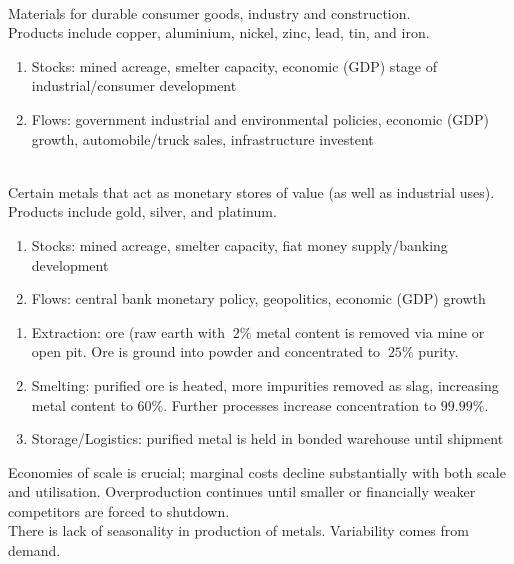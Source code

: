 \begin{remark}  \\
Materials for durable consumer goods, industry and construction.\\
Products include copper, aluminium, nickel, zinc, lead, tin, and iron.
\begin{enumerate}[label=\roman*.]
\setlength{\itemsep}{0pt}
\item Stocks: mined acreage, smelter capacity, economic (GDP) stage of industrial/consumer development
\item Flows: government industrial and environmental policies, economic (GDP) growth, automobile/truck sales, infrastructure investent
\end{enumerate}
\end{remark}

\begin{remark}  \\
Certain metals that act as monetary stores of value (as well as industrial uses).\\
Products include gold, silver, and platinum.
\begin{enumerate}[label=\roman*.]
\setlength{\itemsep}{0pt}
\item Stocks: mined acreage, smelter capacity, fiat money supply/banking development
\item Flows: central bank monetary policy, geopolitics, economic (GDP) growth
\end{enumerate}
\end{remark}

\begin{remark} 
\begin{enumerate}[label=\roman*.]
\setlength{\itemsep}{0pt}
\item Extraction: ore (raw earth with $~2\%$ metal content is removed via mine or open pit. Ore is ground into powder and concentrated to $~25\%$ purity.
\item Smelting: purified ore is heated, more impurities removed as slag, increasing metal content to $60\%$. Further processes increase concentration to $99.99\%$.
\item Storage/Logistics: purified metal is held in bonded warehouse until shipment
\end{enumerate}
Economies of scale is crucial; marginal costs decline substantially with both scale and utilisation. Overproduction continues until smaller or financially weaker competitors are forced to shutdown.\\
There is lack of seasonality in production of metals. Variability comes from demand.
\end{remark}

